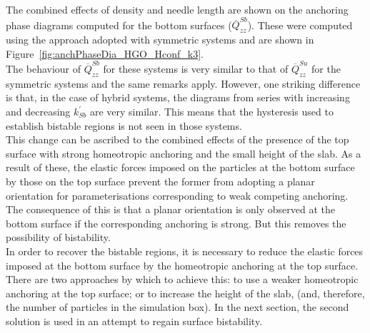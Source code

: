 
The combined effects of density and needle length are shown on the anchoring phase diagrams
computed for the bottom surfaces ($\overline{Q}^{Sb}_{zz}$). These were computed using the
approach adopted with symmetric systems and are shown in
Figure~\ref{fig:anchPhaseDia_HGO_Hconf_k3}.\\
%
The behaviour of $\overline{Q}_{zz}^{Sb}$ for these systems is very similar to that of
$\overline{Q}_{zz}^{Su}$ for the symmetric systems and the same remarks apply. However, one
striking difference is that, in the case of hybrid systems, the diagrams from series with
increasing and decreasing $k^\prime_{Sb}$ are very similar. This means that the hysteresis
used to establish bistable regions is not seen in those systems.\\
This change can be ascribed to the combined effects of the presence of the top surface with
strong homeotropic anchoring and the small height of the slab. As a result of these, the elastic
forces imposed on the particles at the bottom surface by those on the top surface prevent the
former from adopting a planar orientation for parameterisations corresponding to weak
competing anchoring. The consequence of this is that a planar orientation is only observed at
the bottom surface if the corresponding anchoring is strong. But this removes the
possibility of bistability.\\

In order to recover the bistable regions, it is necessary to reduce the elastic forces imposed
at the bottom surface by the homeotropic anchoring at the top surface. There are two approaches
by which to achieve this: to use a weaker homeotropic anchoring at the top surface; or to
increase the height of the slab, (and, therefore, the number of particles in the simulation
box). In the next section, the second solution is used in an attempt to regain surface
bistability.


